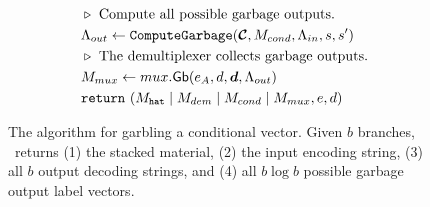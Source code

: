 \begin{figure}
\begin{align*}
    &~~\codecomment{Compute all possible garbage outputs.}\\
    &~~\Lambda_{out} \gets \computegarbage(\vec{\cir}, M_{cond}, \Lambda_{in}, s, s')\\
    &~~\codecomment{The demultiplexer collects garbage outputs.}\\
    &~~\mat_{mux} \gets \gbmux(e_\aid, d, \vec{d}, \Lambda_{out})\\
    &~~\creturn~(\mat_\gadget \mid \mat_{dem} \mid \mat_{cond} \mid \mat_{mux}, e, d)
  \end{align*}
  \caption{%
    The algorithm for garbling a conditional vector.
    Given $b$ branches, \gbcond\ returns (1) the stacked material, (2)
    the input encoding string, (3) all $b$ output decoding strings,
    and (4) all $b\log b$ possible garbage output label vectors.
  }
\end{figure}

